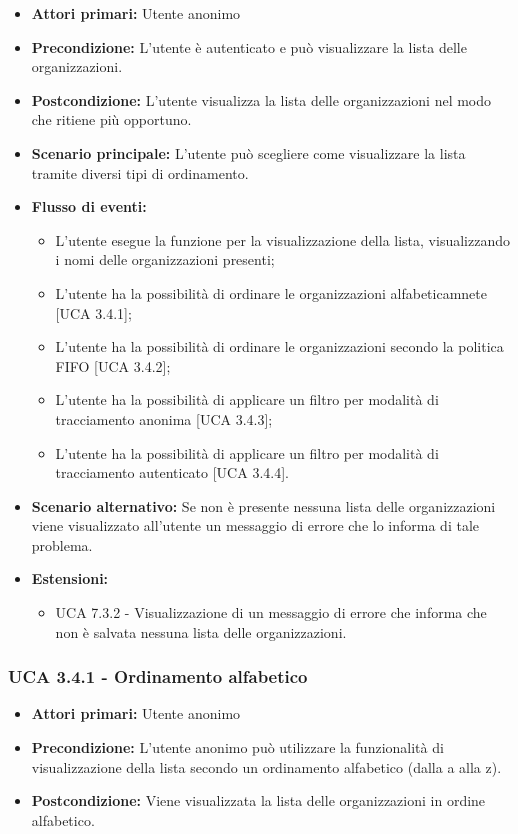 \begin{itemize} 
	\item \textbf{Attori primari:} Utente anonimo
	\item \textbf{Precondizione:}  L'utente è autenticato e può visualizzare la lista delle organizzazioni.
	\item \textbf{Postcondizione:} L'utente visualizza la lista delle organizzazioni nel modo che ritiene più opportuno.
	\item \textbf{Scenario principale:}	L'utente può scegliere come visualizzare la lista tramite diversi tipi di ordinamento.
	\item \textbf{Flusso di eventi:}
	\begin{itemize}
		\item L'utente esegue la funzione per la visualizzazione della lista, visualizzando i nomi delle organizzazioni presenti;
		\item L'utente ha la possibilità di ordinare le organizzazioni alfabeticamnete [UCA 3.4.1];
		\item L'utente ha la possibilità di ordinare le organizzazioni secondo la politica FIFO [UCA 3.4.2];
		\item L'utente ha la possibilità di applicare un filtro per modalità di tracciamento anonima [UCA 3.4.3];
		\item L'utente ha la possibilità di applicare un filtro per modalità di tracciamento autenticato [UCA 3.4.4].
	\end{itemize}
	\item \textbf{Scenario alternativo:} Se non è presente nessuna lista delle organizzazioni viene visualizzato all'utente un messaggio di errore che lo informa di tale problema.
	\item \textbf{Estensioni:}
	\begin{itemize}
		\item UCA 7.3.2 - Visualizzazione di un messaggio di errore che informa che non è salvata nessuna lista delle organizzazioni.
	\end{itemize}
\end{itemize}

\subsubsection{UCA 3.4.1 - Ordinamento alfabetico}%
\begin{itemize}
	\item \textbf{Attori primari:} Utente anonimo
	\item \textbf{Precondizione:} L'utente anonimo può utilizzare la funzionalità di visualizzazione della lista secondo un ordinamento alfabetico (dalla a alla z).
	\item \textbf{Postcondizione:} Viene visualizzata la lista delle organizzazioni in ordine alfabetico.
\end{itemize}

